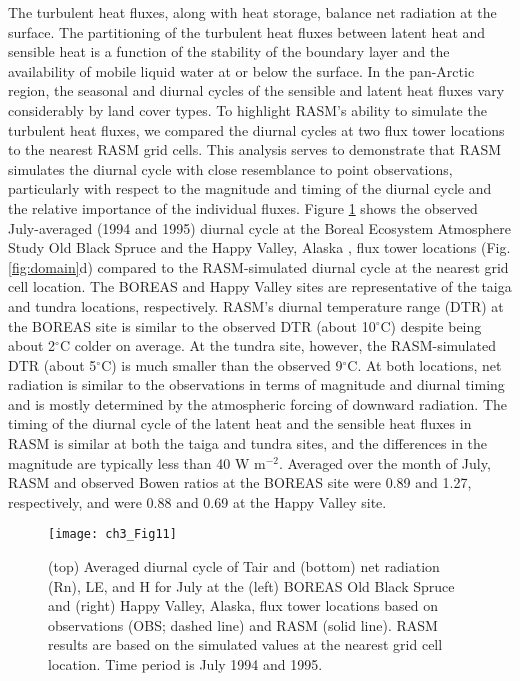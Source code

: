 The turbulent heat fluxes, along with heat storage, balance net radiation at the surface.
The partitioning of the turbulent heat fluxes between latent heat and sensible heat is a function of the stability of the boundary layer and the availability of mobile liquid water at or below the surface.
In the pan-Arctic region, the seasonal and diurnal cycles of the sensible and latent heat fluxes vary considerably by land cover types.
To highlight RASM’s ability to simulate the turbulent heat fluxes, we compared the diurnal cycles at two flux tower locations to the nearest RASM grid cells.
This analysis serves to demonstrate that RASM simulates the diurnal cycle with close resemblance to point observations, particularly with respect to the magnitude and timing of the diurnal cycle and the relative importance of the individual fluxes.
Figure \ref{fig:diurnal_cycle} shows the observed July-averaged (1994 and 1995) diurnal cycle at the Boreal Ecosystem Atmosphere Study \citep[BOREAS; ][]{Sellers_1997} Old Black Spruce \citep{Barr_2006} and the Happy Valley, Alaska \citep{Eugster_2000}, flux tower locations (Fig. \ref{fig:domain}d) compared to the RASM-simulated diurnal cycle at the nearest grid cell location.
The BOREAS and Happy Valley sites are representative of the taiga and tundra locations, respectively.
RASM’s diurnal temperature range (DTR) at the BOREAS site is similar to the observed DTR (about 10$^{\circ}$C) despite being about 2$^{\circ}$C colder on average.
At the tundra site, however, the RASM-simulated DTR (about 5$^{\circ}$C) is much smaller than the observed 9$^{\circ}$C.
At both locations, net radiation is similar to the observations in terms of magnitude and diurnal timing and is mostly determined by the atmospheric forcing of downward radiation.
The timing of the diurnal cycle of the latent heat and the sensible heat fluxes in RASM is similar at both the taiga and tundra sites, and the differences in the magnitude are typically less than 40 W m$^{−2}$.
Averaged over the month of July, RASM and observed Bowen ratios at the BOREAS site were 0.89 and 1.27, respectively, and were 0.88 and 0.69 at the Happy Valley site.

\begin{figure}
  \centering
  \texttt{[image: ch3\_Fig11]}
  \caption{(top) Averaged diurnal cycle of Tair and (bottom) net radiation (Rn), LE, and H for July at the (left) BOREAS Old Black Spruce and (right) Happy Valley, Alaska, flux tower locations based on observations (OBS; dashed line) and RASM (solid line).
  RASM results are based on the simulated values at the nearest grid cell location.
  Time period is July 1994 and 1995.}
  \label{fig:diurnal_cycle}
\end{figure}

